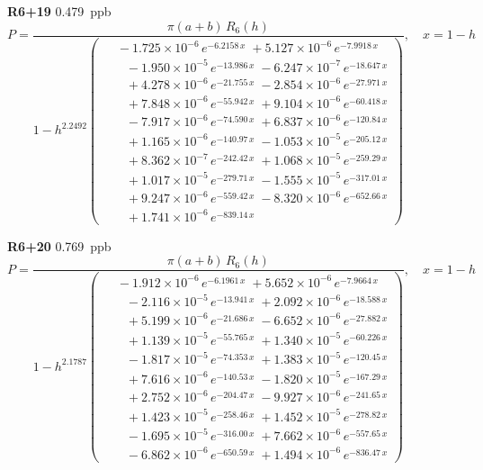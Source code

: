 \documentclass[12pt]{article}
\begin{document}
\noindent\textbf{R6+19} 0.479~ppb\nopagebreak
\begin{equation*}
P = \frac{\pi(a{+}b)\,R_6(h)}{1 - h^{2.2492}\!\left(\!\begin{aligned}
  &\; -1.725{\times}10^{-6}\,e^{-6.2158\,x} \; +5.127{\times}10^{-6}\,e^{-7.9918\,x} \\[-3pt]
  &\quad -1.950{\times}10^{-5}\,e^{-13.986\,x} \; -6.247{\times}10^{-7}\,e^{-18.647\,x} \\[-3pt]
  &\quad +4.278{\times}10^{-6}\,e^{-21.755\,x} \; -2.854{\times}10^{-6}\,e^{-27.971\,x} \\[-3pt]
  &\quad +7.848{\times}10^{-6}\,e^{-55.942\,x} \; +9.104{\times}10^{-6}\,e^{-60.418\,x} \\[-3pt]
  &\quad -7.917{\times}10^{-6}\,e^{-74.590\,x} \; +6.837{\times}10^{-6}\,e^{-120.84\,x} \\[-3pt]
  &\quad +1.165{\times}10^{-6}\,e^{-140.97\,x} \; -1.053{\times}10^{-5}\,e^{-205.12\,x} \\[-3pt]
  &\quad +8.362{\times}10^{-7}\,e^{-242.42\,x} \; +1.068{\times}10^{-5}\,e^{-259.29\,x} \\[-3pt]
  &\quad +1.017{\times}10^{-5}\,e^{-279.71\,x} \; -1.555{\times}10^{-5}\,e^{-317.01\,x} \\[-3pt]
  &\quad +9.247{\times}10^{-6}\,e^{-559.42\,x} \; -8.320{\times}10^{-6}\,e^{-652.66\,x} \\[-3pt]
  &\quad +1.741{\times}10^{-6}\,e^{-839.14\,x}
\end{aligned}\!\right)}, \quad x = 1{-}h
\end{equation*}

\noindent\textbf{R6+20} 0.769~ppb\nopagebreak
\begin{equation*}
P = \frac{\pi(a{+}b)\,R_6(h)}{1 - h^{2.1787}\!\left(\!\begin{aligned}
  &\; -1.912{\times}10^{-6}\,e^{-6.1961\,x} \; +5.652{\times}10^{-6}\,e^{-7.9664\,x} \\[-3pt]
  &\quad -2.116{\times}10^{-5}\,e^{-13.941\,x} \; +2.092{\times}10^{-6}\,e^{-18.588\,x} \\[-3pt]
  &\quad +5.199{\times}10^{-6}\,e^{-21.686\,x} \; -6.652{\times}10^{-6}\,e^{-27.882\,x} \\[-3pt]
  &\quad +1.139{\times}10^{-5}\,e^{-55.765\,x} \; +1.340{\times}10^{-5}\,e^{-60.226\,x} \\[-3pt]
  &\quad -1.817{\times}10^{-5}\,e^{-74.353\,x} \; +1.383{\times}10^{-5}\,e^{-120.45\,x} \\[-3pt]
  &\quad +7.616{\times}10^{-6}\,e^{-140.53\,x} \; -1.820{\times}10^{-5}\,e^{-167.29\,x} \\[-3pt]
  &\quad +2.752{\times}10^{-6}\,e^{-204.47\,x} \; -9.927{\times}10^{-6}\,e^{-241.65\,x} \\[-3pt]
  &\quad +1.423{\times}10^{-5}\,e^{-258.46\,x} \; +1.452{\times}10^{-5}\,e^{-278.82\,x} \\[-3pt]
  &\quad -1.695{\times}10^{-5}\,e^{-316.00\,x} \; +7.662{\times}10^{-6}\,e^{-557.65\,x} \\[-3pt]
  &\quad -6.862{\times}10^{-6}\,e^{-650.59\,x} \; +1.494{\times}10^{-6}\,e^{-836.47\,x}
\end{aligned}\!\right)}, \quad x = 1{-}h
\end{equation*}
\end{document}
